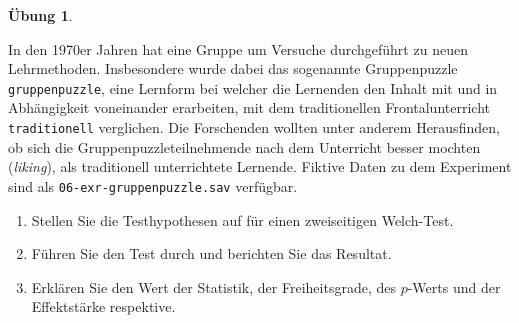 \documentclass[
]{book}
\providecommand{\tightlist}{%
  \setlength{\itemsep}{0pt}\setlength{\parskip}{0pt}}
\theoremstyle{definition}
\theoremstyle{definition}
\theoremstyle{definition}
\newtheorem{exercise}{Übung}[chapter]
\theoremstyle{definition}
\theoremstyle{remark}
\begin{document}
\begin{exercise}
\protect\hypertarget{exr:gruppenpuzzle}{}\label{exr:gruppenpuzzle}\leavevmode

In den 1970er Jahren hat eine Gruppe um \citet{blaney1977} Versuche durchgeführt zu neuen Lehrmethoden. Insbesondere wurde dabei das sogenannte Gruppenpuzzle \texttt{gruppenpuzzle}, eine Lernform bei welcher die Lernenden den Inhalt mit und in Abhängigkeit voneinander erarbeiten, mit dem traditionellen Frontalunterricht \texttt{traditionell} verglichen. Die Forschenden wollten unter anderem Herausfinden, ob sich die Gruppenpuzzleteilnehmende nach dem Unterricht besser mochten (\emph{liking}), als traditionell unterrichtete Lernende. Fiktive Daten zu dem Experiment sind als \texttt{06-exr-gruppenpuzzle.sav} verfügbar.

\begin{enumerate}
\def\labelenumi{\alph{enumi})}
\tightlist
\item
  Stellen Sie die Testhypothesen auf für einen zweiseitigen Welch-Test.
\item
  Führen Sie den Test durch und berichten Sie das Resultat.
\item
  Erklären Sie den Wert der Statistik, der Freiheitsgrade, des \(p\)-Werts und der Effektstärke respektive.
\end{enumerate}

\end{exercise}
\end{document}

